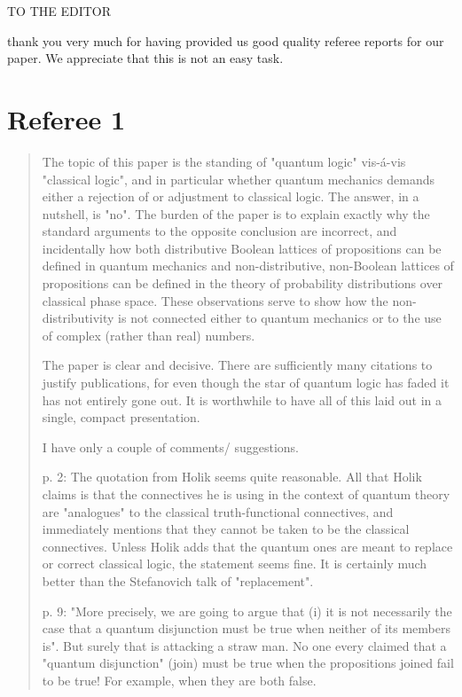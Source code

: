 \documentclass[11pt]{article}
\begin{document}
TO THE EDITOR

thank you very much for having provided us
good quality referee reports for our paper. We appreciate that this is
not an easy task.



\section*{Referee 1}

\begin{quote}
The topic of this paper is the standing of "quantum logic" vis-á-vis "classical logic", and in particular whether quantum mechanics demands either a rejection of or adjustment to classical logic. The answer, in a nutshell, is "no". The burden of the paper is to explain exactly why the standard arguments to the opposite conclusion are incorrect, and incidentally how both distributive Boolean lattices of propositions can be defined in quantum mechanics and non-distributive, non-Boolean lattices of propositions can be defined in the theory of probability distributions over classical phase space. These observations serve to show how the non-distributivity is not connected either to quantum mechanics or to the use of complex (rather than real) numbers.

The paper is clear and decisive. There are sufficiently many citations to justify publications, for even though the star of quantum logic has faded it has not entirely gone out. It is worthwhile to have all of this laid out in a single, compact presentation.

I have only a couple of comments/ suggestions.

p. 2: The quotation from Holik seems quite reasonable. All that Holik claims is that the connectives he is using in the context of quantum theory are "analogues" to the classical truth-functional connectives, and immediately mentions that they cannot be taken to be the classical connectives. Unless Holik adds that the quantum ones are meant to replace or correct classical logic, the statement seems fine. It is certainly much better than the Stefanovich talk of "replacement".

p. 9: "More precisely, we are going to argue that (i) it is not necessarily the case that a quantum
disjunction must be true when neither of its members is". But surely that is attacking a straw man. No one every claimed that a "quantum disjunction" (join) must be true when the propositions joined fail to be true! For example, when they are both false.

\end{quote}
\end{document}
